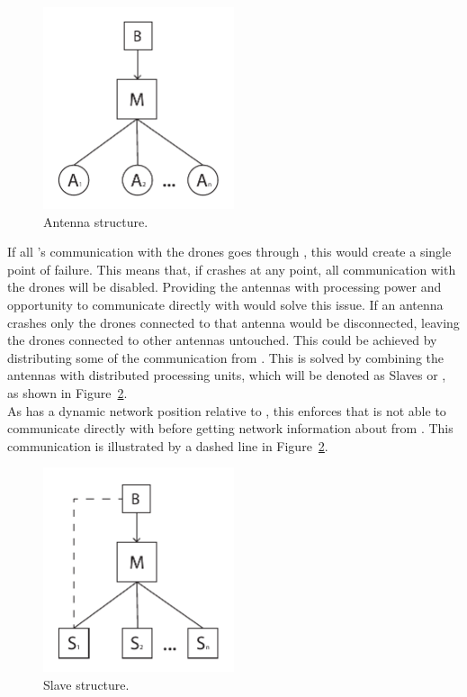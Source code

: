 \begin{figure}[htb]
    \centering
    \includegraphics[width=0.5\textwidth]{gfx/antenna_structure.pdf}
    \caption{Antenna structure.}
    \label{fig:antenna_structure}
\end{figure}

If all 's communication with the drones goes through , this would create a single point of failure.
This means that, if  crashes at any point, all communication with the drones will be disabled.
Providing the antennas with processing power and opportunity to communicate directly with  would solve this issue.
If an antenna crashes only the drones connected to that antenna would be disconnected, leaving the drones connected to other antennas untouched.
This could be achieved by distributing some of the communication from .
This is solved by combining the antennas with distributed processing units, which will be denoted as Slaves or , as shown in Figure~\ref{fig:slave_structure}. \\

As  has a dynamic network position relative to , this enforces that  is not able to communicate directly with  before getting network information about  from . This communication is illustrated by a dashed line in Figure~\ref{fig:slave_structure}. \\

\begin{figure}[htb]
    \centering
    \includegraphics[width=0.5\textwidth]{gfx/slave_structure.pdf}
    \caption{Slave structure.}
    \label{fig:slave_structure}
\end{figure}

